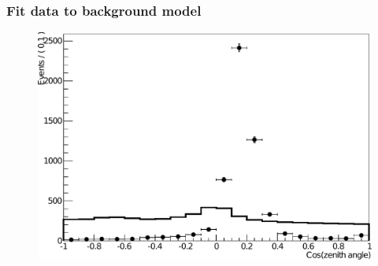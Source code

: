 \documentclass[14pt]{beamer}
\begin{document}
\begin{frame}
	\frametitle{Fit data to background model}
	\begin{figure}
		\centering
		\includegraphics[width=\linewidth]{fit_data_to_bkg_model_noChi2TCut.pdf}
	\end{figure}
\end{frame}
\end{document}
